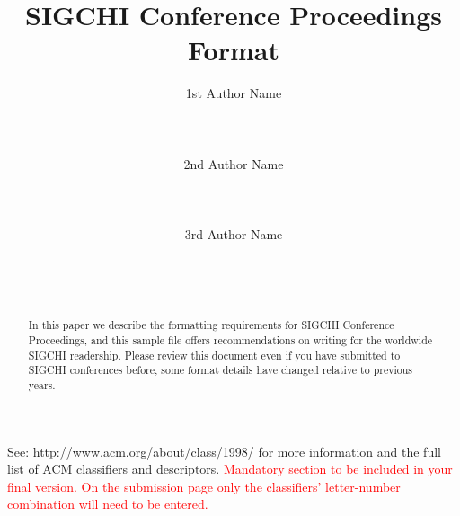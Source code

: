 \documentclass{sigchi-alternate}
\begin{document}
\title{SIGCHI Conference Proceedings Format}

\author{
  \alignauthor 1st Author Name\\
    \\
    \\
    \\
  \alignauthor 2nd Author Name\\
    \\
    \\
    \\
  \alignauthor 3rd Author Name\\
    \\
    \\
    \\
}


\maketitle

\begin{abstract}
In this paper we describe the formatting requirements for
SIGCHI Conference Proceedings, and this sample file
offers recommendations on writing for the worldwide
SIGCHI readership. Please review this document even if
you have submitted to SIGCHI conferences before, some
format details have changed relative to previous years.
\end{abstract}



See: \url{http://www.acm.org/about/class/1998/}
for more information and the full list of ACM classifiers
and descriptors. 
\textcolor{red}{Mandatory section to be included in your
final version. On the submission page only the classifiers'
letter-number combination will need to be entered.}
\end{document}
